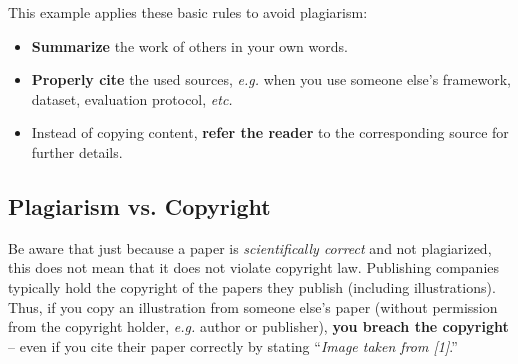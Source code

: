 \documentclass[11pt,a4paper]{article}
\begin{document}
\begin{goodexample}
  \label{ex-avoid-plagiarism}

  \begin{figure}[H]
    \centering%
    {%
      \setlength{\fboxsep}{0pt}%
      \setlength{\fboxrule}{2pt}%
    }
  \end{figure}
This example applies these basic rules to avoid plagiarism:
\vspace{0.5em}
  \begin{itemize}
    \item \textbf{Summarize} the work of others in your own words.
    \item \textbf{Properly cite} the used sources, \emph{e.g.} when you use someone else's framework, dataset, evaluation protocol, \emph{etc.}
    \item Instead of copying content, \textbf{refer the reader} to the corresponding source for further details.
  \end{itemize}
\end{goodexample}


\subsection{Plagiarism vs. Copyright}
Be aware that just because a paper is \emph{scientifically correct} and not plagiarized, this does not mean that it does not violate copyright law.
Publishing companies typically hold the copyright of the papers they publish (including illustrations).
Thus, if you copy an illustration from someone else's paper (without permission from the copyright holder, \emph{e.g.} author or publisher), \textbf{you breach the copyright} -- even if you cite their paper correctly by stating ``\emph{Image taken from [1]}.''
\end{document}
